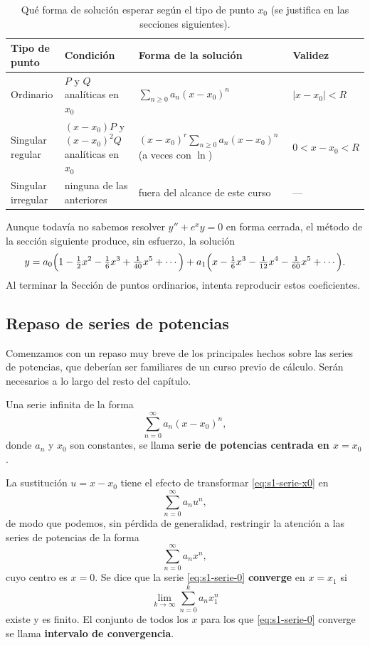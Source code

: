 \begin{table}[H]
\centering
\small
\caption{Qué forma de solución esperar según el tipo de punto $x_0$ (se justifica en las secciones siguientes).}
\label{tab:s1-formas}
\begin{tabular}{|p{2.9cm}|p{4.4cm}|p{4.2cm}|p{3.2cm}|}
\hline
\rowcolor{bbe!15}\textbf{Tipo de punto} & \textbf{Condición} & \textbf{Forma de la solución} & \textbf{Validez} \\ \hline
Ordinario & $P$ y $Q$ analíticas en $x_0$ & $\displaystyle\sum_{n\ge 0} a_n(x-x_0)^n$ & $|x-x_0|<R$ \\ \hline
Singular regular & $(x-x_0)P$ y $(x-x_0)^2Q$ analíticas en $x_0$ & $(x-x_0)^r\displaystyle\sum_{n\ge 0} a_n(x-x_0)^n$ (a veces con $\ln$) & $0<x-x_0<R$ \\ \hline
Singular irregular & ninguna de las anteriores & fuera del alcance de este curso & --- \\ \hline
\end{tabular}
\end{table}
 
\begin{remark}
Aunque todavía no sabemos resolver $y''+e^xy=0$ en forma cerrada, el método de la sección siguiente produce, sin esfuerzo, la solución
\[
y = a_0\Bigl(1-\tfrac{1}{2}x^2-\tfrac{1}{6}x^3+\tfrac{1}{40}x^5+\cdots\Bigr)
 + a_1\Bigl(x-\tfrac{1}{6}x^3-\tfrac{1}{12}x^4-\tfrac{1}{60}x^5+\cdots\Bigr).
\]
Al terminar la Sección de puntos ordinarios, intenta reproducir estos coeficientes.
\end{remark}
 
\subsection{Repaso de series de potencias}
 Comenzamos con un repaso muy breve de los principales hechos sobre las series de potencias, que deberían ser familiares de un curso previo de cálculo. Serán necesarios a lo largo del resto del capítulo.
 
 \begin{definition}
     Una serie infinita de la forma
\begin{equation}
\sum_{n=0}^{\infty} a_n(x - x_0)^n,
\label{eq:s1-serie-x0}
\end{equation}
donde $a_n$ y $x_0$ son constantes, se llama \textbf{serie de potencias centrada en $x = x_0$}.
 
\vspace{0.3cm}
 
La sustitución $u = x - x_0$ tiene el efecto de transformar \eqref{eq:s1-serie-x0} en
\[ \sum_{n=0}^{\infty} a_n u^n, \]
de modo que podemos, sin pérdida de generalidad, restringir la atención a las series de potencias de la forma
\begin{equation}
\sum_{n=0}^{\infty} a_n x^n,
\label{eq:s1-serie-0}
\end{equation}
cuyo centro es $x = 0$. Se dice que la serie \eqref{eq:s1-serie-0} \textbf{converge} en $x = x_1$ si
\[ \lim_{k \to \infty} \sum_{n=0}^{k} a_n x_1^n \]
existe y es finito. El conjunto de todos los $x$ para los que \eqref{eq:s1-serie-0} converge se llama \textbf{intervalo de convergencia}.
 \end{definition}
 
